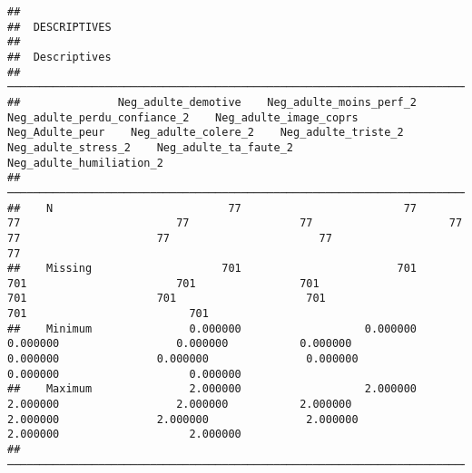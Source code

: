 \documentclass[
]{article}
\begin{document}
\begin{verbatim}
## 
##  DESCRIPTIVES
## 
##  Descriptives                                                                                                                                                                                                                                                         
##  ──────────────────────────────────────────────────────────────────────────────────────────────────────────────────────────────────────────────────────────────────────────────────────────────────────────────────────────────────────────────────────────────────── 
##               Neg_adulte_demotive    Neg_adulte_moins_perf_2    Neg_adulte_perdu_confiance_2    Neg_adulte_image_coprs    Neg_Adulte_peur    Neg_adulte_colere_2    Neg_adulte_triste_2    Neg_adulte_stress_2    Neg_adulte_ta_faute_2    Neg_adulte_humiliation_2   
##  ──────────────────────────────────────────────────────────────────────────────────────────────────────────────────────────────────────────────────────────────────────────────────────────────────────────────────────────────────────────────────────────────────── 
##    N                           77                         77                              77                        77                 77                     77                     77                     77                       77                          77   
##    Missing                    701                        701                             701                       701                701                    701                    701                    701                      701                         701   
##    Minimum               0.000000                   0.000000                        0.000000                  0.000000           0.000000               0.000000               0.000000               0.000000                 0.000000                    0.000000   
##    Maximum               2.000000                   2.000000                        2.000000                  2.000000           2.000000               2.000000               2.000000               2.000000                 2.000000                    2.000000   
##  ────────────────────────────────────────────────────────────────────────────────────────────────────────────────────────────────────────────────────────────────────────────────────────────────────────────────────────────────────────────────────────────────────
\end{verbatim}
\end{document}
